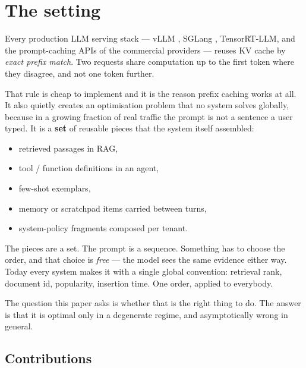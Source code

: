 \documentclass[11pt]{article}
\theoremstyle{plain}
\begin{document}
\section{The setting}

Every production LLM serving stack --- vLLM \cite{KWO23}, SGLang \cite{SGL}, TensorRT-LLM, and the prompt-caching APIs of the commercial providers --- reuses KV cache by \emph{exact prefix match}. Two requests share computation up to the first token where they disagree, and not one token further.

That rule is cheap to implement and it is the reason prefix caching works at all. It also quietly creates an optimisation problem that no system solves globally, because in a growing fraction of real traffic the prompt is not a sentence a user typed. It is a \textbf{set} of reusable pieces that the system itself assembled:

\begin{itemize}
\item retrieved passages in RAG,
\item tool / function definitions in an agent,
\item few-shot exemplars,
\item memory or scratchpad items carried between turns,
\item system-policy fragments composed per tenant.
\end{itemize}

The pieces are a set. The prompt is a sequence. Something has to choose the order, and that choice is \emph{free} --- the model sees the same evidence either way. Today every system makes it with a single global convention: retrieval rank, document id, popularity, insertion time. One order, applied to everybody.

The question this paper asks is whether that is the right thing to do. The answer is that it is optimal only in a degenerate regime, and asymptotically wrong in general.

\subsection{Contributions}
\end{document}
